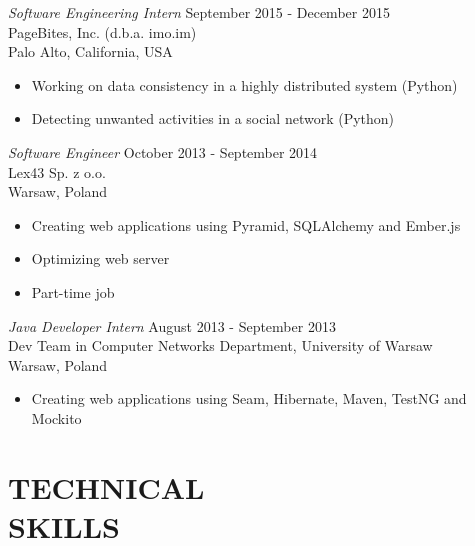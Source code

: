 \documentclass[margin, 10pt]{res} %
\begin{document}
\begin{resume}
{\sl Software Engineering Intern} \hfill September 2015 - December 2015 \\
PageBites, Inc. (d.b.a. imo.im) \\
Palo Alto, California, USA

\begin{itemize} \itemsep -2pt %
\item Working on data consistency in a highly distributed system (Python)
\item Detecting unwanted activities in a social network (Python)
\end{itemize}


{\sl Software Engineer} \hfill October 2013 - September 2014 \\
Lex43 Sp. z o.o. \\ 
Warsaw, Poland

\begin{itemize} \itemsep -2pt %
\item Creating web applications using Pyramid, SQLAlchemy and Ember.js
\item Optimizing web server
\item Part-time job
\end{itemize}
 
{\sl Java Developer Intern } \hfill August 2013 - September 2013 \\
Dev Team in Computer Networks Department, University of Warsaw \\
Warsaw, Poland
\begin{itemize} 
\item Creating web applications using Seam, Hibernate, Maven, TestNG and Mockito
\end{itemize}


\section{TECHNICAL \\ SKILLS} 


\end{resume}
\end{document}
